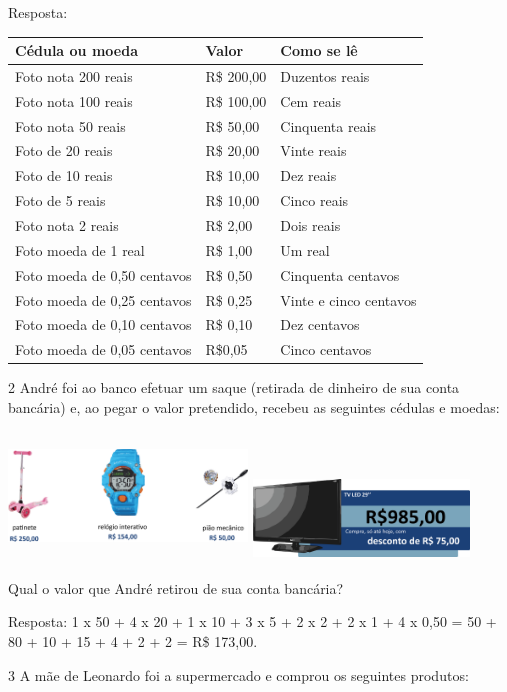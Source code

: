 \begin{escolha}
{Resposta:

\begin{longtable}[]{@{}lll@{}}
\toprule
Cédula ou moeda & Valor & Como se lê\tabularnewline
\midrule
\endhead
Foto nota 200 reais & R\$ 200,00 & Duzentos reais\tabularnewline
Foto nota 100 reais & R\$ 100,00 & Cem reais\tabularnewline
Foto nota 50 reais & R\$ 50,00 & Cinquenta reais\tabularnewline
Foto de 20 reais & R\$ 20,00 & Vinte reais\tabularnewline
Foto de 10 reais & R\$ 10,00 & Dez reais\tabularnewline
Foto de 5 reais & R\$ 10,00 & Cinco reais\tabularnewline
Foto nota 2 reais & R\$ 2,00 & Dois reais\tabularnewline
Foto moeda de 1 real & R\$ 1,00 & Um real\tabularnewline
Foto moeda de 0,50 centavos & R\$ 0,50 & Cinquenta
centavos\tabularnewline
Foto moeda de 0,25 centavos & R\$ 0,25 & Vinte e cinco
centavos\tabularnewline
Foto moeda de 0,10 centavos & R\$ 0,10 & Dez centavos\tabularnewline
Foto moeda de 0,05 centavos & R\$0,05 & Cinco centavos\tabularnewline
\bottomrule
\end{longtable}

\num{2} André foi ao banco efetuar um saque (retirada de dinheiro de sua conta
bancária) e, ao pegar o valor pretendido, recebeu as seguintes cédulas e moedas:


\includegraphics[width=2.50022in,height=1.34178in]{media/image72.png}
\includegraphics[width=2.26686in,height=0.87508in]{media/image73.png}

Qual o valor que André retirou de sua conta bancária?


Resposta:
1 x 50 + 4 x 20 + 1 x 10 + 3 x 5 + 2 x 2 + 2 x 1 + 4 x 0,50 = 50 + 80 +
10 + 15 + 4 + 2 + 2 = R\$ 173,00.

\num{3} A mãe de Leonardo foi a supermercado e comprou os seguintes produtos:

}
\end{escolha}
